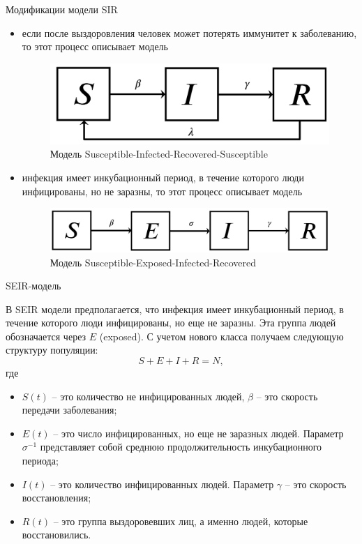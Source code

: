 \documentclass[notheorems]{beamer}
\begin{document}
\begin{frame}
	{Модификации модели SIR}
	\begin{itemize}
		\item если после выздоровления человек может потерять иммунитет к заболеванию, то этот процесс описывает модель
		\begin{figure}
			\centering
			\includegraphics[scale=0.15]{images/img07}
			\caption{Модель Susceptible-Infected-Recovered-Susceptible}
			\label{fig:img07}
		\end{figure}
		
		\item инфекция имеет инкубационный период, в течение которого люди инфицированы, но не заразны, то этот процесс описывает модель 
		\begin{figure}
			\centering
			\includegraphics[scale=0.15]{images/img08}
			\caption{Модель Susceptible-Exposed-Infected-Recovered}
			\label{fig:img08}
		\end{figure}
		
	\end{itemize}
\end{frame}



\begin{frame}
	{SEIR-модель}
	\small{В SEIR модели предполагается, что инфекция имеет инкубационный период, в течение которого люди инфицированы, но
	еще не заразны. Эта группа людей обозначается через $E$ (exposed). С учетом нового класса получаем следующую структуру
	популяции:
	$$S + E + I + R = N,$$ где
	\begin{itemize}
		\item $S(t)$ -- это количество не инфицированных людей, $\beta$ -- это скорость передачи заболевания;
		\item $E(t)$ -- это число инфицированных, но еще не заразных людей.  Параметр $\sigma^{-1}$ представляет собой среднюю продолжительность инкубационного периода;
		\item $I(t)$ -- это количество инфицированных людей. Параметр $\gamma$ -- это скорость восстановления;
		\item $R(t)$ -- это группа выздоровевших лиц, а именно людей, которые восстановились.
	\end{itemize}
}
\end{frame}
\end{document}
